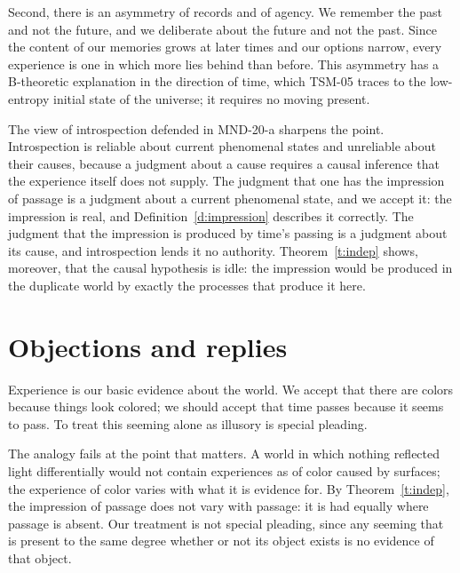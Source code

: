 \documentclass{situationist-preprint}
\begin{document}
Second, there is an asymmetry of records and of agency. We remember the past and not the future, and we deliberate about the future and not the past. Since the content of our memories grows at later times and our options narrow, every experience is one in which more lies behind than before. This asymmetry has a B-theoretic explanation in the direction of time, which TSM-05 traces to the low-entropy initial state of the universe; it requires no moving present.

The view of introspection defended in MND-20-a sharpens the point. Introspection is reliable about current phenomenal states and unreliable about their causes, because a judgment about a cause requires a causal inference that the experience itself does not supply. The judgment that one has the impression of passage is a judgment about a current phenomenal state, and we accept it: the impression is real, and Definition~\ref{d:impression} describes it correctly. The judgment that the impression is produced by time's passing is a judgment about its cause, and introspection lends it no authority. Theorem~\ref{t:indep} shows, moreover, that the causal hypothesis is idle: the impression would be produced in the duplicate world by exactly the processes that produce it here.

\section{Objections and replies}

\begin{objection}
Experience is our basic evidence about the world. We accept that there are colors because things look colored; we should accept that time passes because it seems to pass. To treat this seeming alone as illusory is special pleading.
\end{objection}

\begin{reply}
The analogy fails at the point that matters. A world in which nothing reflected light differentially would not contain experiences as of color caused by surfaces; the experience of color varies with what it is evidence for. By Theorem~\ref{t:indep}, the impression of passage does not vary with passage: it is had equally where passage is absent. Our treatment is not special pleading, since any seeming that is present to the same degree whether or not its object exists is no evidence of that object.
\end{reply}
\end{document}
